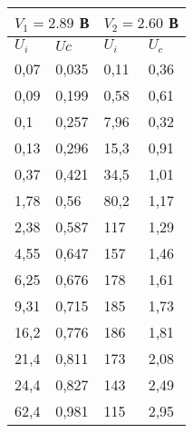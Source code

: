 \begin{table}[h!]
    \centering
    \begin{tabular}{|ll|ll|}
    \hline
    \multicolumn{2}{|l|}{$V_1 = 2.89$ В}                & \multicolumn{2}{l|}{$V_2 = 2.60$ В}          \\ \hline
    \multicolumn{1}{|l|}{$U_i$}   & $Uc$                & \multicolumn{1}{l|}{$U_i$}   & $U_c$         \\ \hline
    \multicolumn{1}{|l|}{0,07}    & 0,035               & \multicolumn{1}{l|}{0,11}    & 0,36          \\ \hline
    \multicolumn{1}{|l|}{0,09}    & 0,199               & \multicolumn{1}{l|}{0,58}    & 0,61          \\ \hline
    \multicolumn{1}{|l|}{0,1}     & 0,257               & \multicolumn{1}{l|}{7,96}    & 0,32          \\ \hline
    \multicolumn{1}{|l|}{0,13}    & 0,296               & \multicolumn{1}{l|}{15,3}    & 0,91          \\ \hline
    \multicolumn{1}{|l|}{0,37}    & 0,421               & \multicolumn{1}{l|}{34,5}    & 1,01          \\ \hline
    \multicolumn{1}{|l|}{1,78}    & 0,56                & \multicolumn{1}{l|}{80,2}    & 1,17          \\ \hline
    \multicolumn{1}{|l|}{2,38}    & 0,587               & \multicolumn{1}{l|}{117}     & 1,29          \\ \hline
    \multicolumn{1}{|l|}{4,55}    & 0,647               & \multicolumn{1}{l|}{157}     & 1,46          \\ \hline
    \multicolumn{1}{|l|}{6,25}    & 0,676               & \multicolumn{1}{l|}{178}     & 1,61          \\ \hline
    \multicolumn{1}{|l|}{9,31}    & 0,715               & \multicolumn{1}{l|}{185}     & 1,73          \\ \hline
    \multicolumn{1}{|l|}{16,2}    & 0,776               & \multicolumn{1}{l|}{186}     & 1,81          \\ \hline
    \multicolumn{1}{|l|}{21,4}    & 0,811               & \multicolumn{1}{l|}{173}     & 2,08          \\ \hline
    \multicolumn{1}{|l|}{24,4}    & 0,827               & \multicolumn{1}{l|}{143}     & 2,49          \\ \hline
    \multicolumn{1}{|l|}{62,4}    & 0,981               & \multicolumn{1}{l|}{115}     & 2,95          \\ \hline

\end{tabular}
\end{table}
